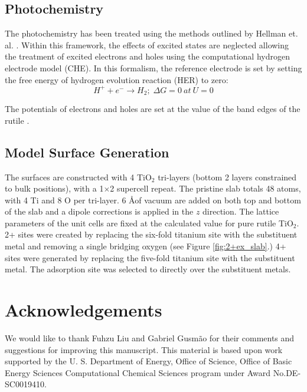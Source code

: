 \subsection{Photochemistry}
\label{sec:PEC_methods}
The photochemistry has been treated using the methods outlined by Hellman et. al. \cite{Hellman2017}. Within this framework, the effects of excited states are neglected allowing the treatment of excited electrons and holes using the computational hydrogen electrode model (CHE). In this formalism, the reference electrode is set by setting the free energy of hydrogen evolution reaction (HER) to zero:
\begin{equation}
    H^+ + e^- \rightarrow H_2;\; \Delta G = 0\:at\: U = 0
\end{equation}

The potentials of electrons and holes are set at the value of the band edges of the rutile \cite{Nozik_1996}.

\subsection{Model Surface Generation}
 The surfaces are constructed with 4 TiO$_2$ tri-layers (bottom 2 layers constrained to bulk positions), with a 1$\times$2 supercell repeat. The pristine slab totals 48 atoms, with 4 Ti and 8 O per tri-layer. 6 \AA  of vacuum are added on both top and bottom of the slab and a dipole corrections is applied in the $z$ direction\cite{Dipole_paper}. The lattice parameters of the unit cells are fixed at the calculated value for pure rutile TiO$_2$. 2+ sites were created by replacing the six-fold titanium site with the substituent metal and removing a single bridging oxygen (see Figure \ref{fig:2+ex_slab}.) 4+ sites were generated by replacing the five-fold titanium site with the substituent metal. The adsorption site was selected to directly over the substituent metals. 

\section{Acknowledgements}
We would like to thank Fuhzu Liu and Gabriel Gusm\~ao for their comments and suggestions for improving this manuscript. This material is based upon work supported by the U. S. Department of Energy, Office of Science, Office of Basic Energy Sciences Computational Chemical Sciences program under Award No.DE-SC0019410. 



\appendix



